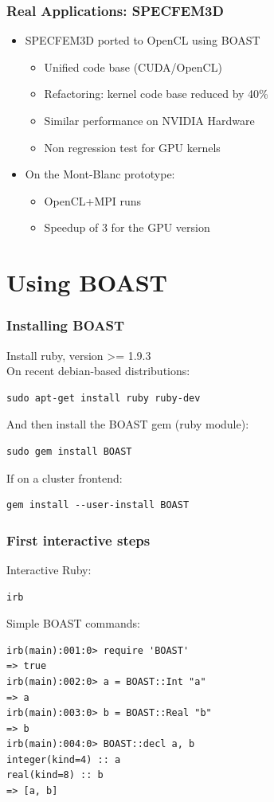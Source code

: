 \documentclass{beamer}
\begin{document}
\begin{frame}
  \frametitle{Real Applications: SPECFEM3D}

  \begin{itemize}
    \item SPECFEM3D ported to OpenCL using BOAST
    \begin{itemize}
      \item Unified code base (CUDA/OpenCL)
      \item Refactoring: kernel code base reduced by 40\%
      \item Similar performance on NVIDIA Hardware
      \item Non regression test for GPU kernels
    \end{itemize}
    \item On the Mont-Blanc prototype:
    \begin{itemize}
      \item OpenCL+MPI runs
      \item Speedup of 3 for the GPU version
    \end{itemize}
  \end{itemize}
\end{frame}

\section{Using BOAST}

\begin{frame}[fragile]

    \frametitle{Installing BOAST}

Install ruby, version >= 1.9.3\\
On recent debian-based distributions:
\lstset{style=Bash}
\begin{lstlisting}
sudo apt-get install ruby ruby-dev
\end{lstlisting}
And then install the BOAST gem (ruby module):
\begin{lstlisting}
sudo gem install BOAST
\end{lstlisting}
If on a cluster frontend:
\begin{lstlisting}
gem install --user-install BOAST
\end{lstlisting}

\end{frame}

\begin{frame}[fragile]
\frametitle{First interactive steps}
Interactive Ruby:
\lstset{style=Bash}
\begin{lstlisting}
irb
\end{lstlisting}
Simple BOAST commands:
\lstset{style=BOAST}
\begin{lstlisting}
irb(main):001:0> require 'BOAST'
=> true
irb(main):002:0> a = BOAST::Int "a"
=> a
irb(main):003:0> b = BOAST::Real "b"
=> b
irb(main):004:0> BOAST::decl a, b
integer(kind=4) :: a
real(kind=8) :: b
=> [a, b]
\end{lstlisting}
\end{frame}
\end{document}
